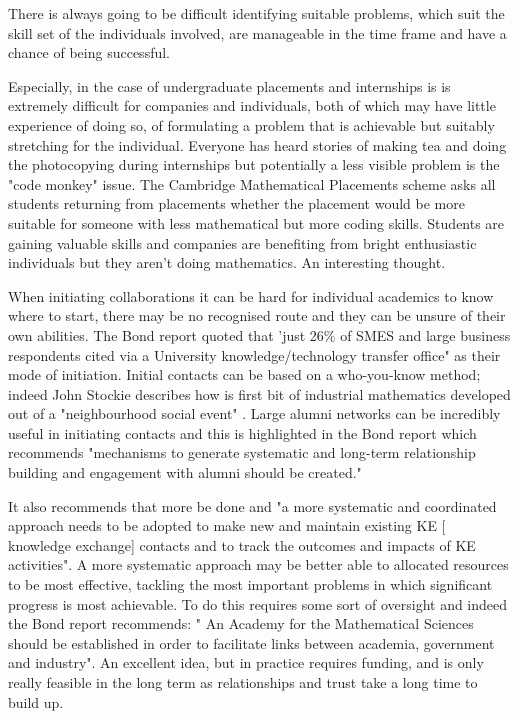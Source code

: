 \documentclass[11pt]{article} %
\begin{document}
	There is always going to be difficult identifying suitable problems, which suit the skill set of the individuals involved, are manageable in the time frame and have a chance of being successful. 
	
	Especially, in the case of undergraduate placements and internships is is extremely difficult for companies and individuals, both of which may have little experience of doing so, of formulating a problem that is achievable but suitably stretching for the individual. Everyone has heard stories of making tea and doing the photocopying during internships but potentially a less visible problem is the "code monkey" issue. The Cambridge Mathematical Placements scheme asks all students returning from placements whether the placement would be more suitable for someone with less mathematical but more coding skills. Students are gaining valuable skills and companies are benefiting from bright enthusiastic individuals but they aren't doing mathematics. An interesting thought. 
	
	
	
	When initiating collaborations it can be hard for individual academics to know where to start, there may be  no recognised route and they can be  unsure of their own abilities.	The Bond report quoted that 'just 26\% of SMES and large business respondents cited via a University knowledge/technology transfer office" as their mode of initiation. Initial contacts can be based on a who-you-know  method; indeed John Stockie describes how is first bit of industrial mathematics developed out of a  "neighbourhood social event" \cite{Stockie2015}. Large alumni networks can be incredibly useful in initiating contacts and this is highlighted in the Bond report \cite{Bond}  which recommends "mechanisms to generate systematic and long-term relationship building and engagement with alumni should be created."
	
	It also recommends that more be done  and "a more systematic and coordinated approach needs to be adopted to make new and maintain existing KE [ knowledge exchange] contacts and to track the outcomes and impacts of KE activities". A more systematic approach may be better able to allocated resources to be most effective, tackling the most important problems in which significant progress is most achievable. To do this requires some sort of oversight and indeed the Bond report recommends: " An Academy for the Mathematical Sciences should be established in order to facilitate links between academia, government and industry". An excellent idea, but in practice requires funding, and is only really feasible in the long term as relationships and trust take a long time to build up. 
	
\end{document}
